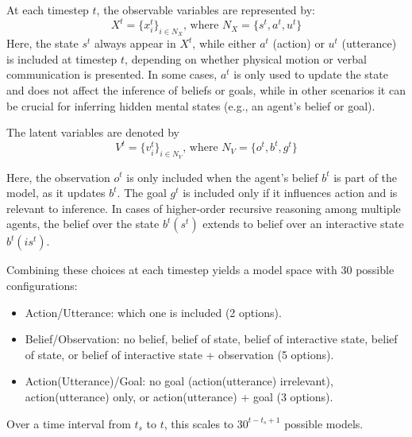 At each timestep $t$, the observable variables are represented by:
$$X^t = \{x_i^t\}_{i \in N_X} \text{, where } N_X = \{s^t, a^t, u^t\}$$
Here, the state $s^t$ always appear in $X^t$, while either $a^t$ (action) or $u^t$ (utterance) is included at timestep $t$, depending on whether physical motion or verbal communication is presented. In some cases, $a^t$ is only used to update the state and does not affect the inference of beliefs or goals, while in other scenarios it can be crucial for inferring hidden mental states (e.g., an agent’s belief or goal).

The latent variables are denoted by
$$V^t = \{v_i^t\}_{i \in N_V} \text{, where } N_V = \{o^t, b^t, g^t\}$$

Here, the observation $o^t$ is only included when the agent’s belief $b^t$ is part of the model, as it updates $b^t$. The goal $g^t$ is included only if it influences action and is relevant to inference. In cases of higher-order recursive reasoning among multiple agents, the belief over the state $b^t(s^t)$ extends to belief over an interactive state $b^t(is^t)$.

Combining these choices at each timestep yields a model space with 30 possible configurations:
\begin{itemize}
\setlength\itemsep{0pt}
    \item Action/Utterance: which one is included (2 options).
    \item Belief/Observation: no belief, belief of state, belief of interactive state, belief of state, or belief of interactive state + observation (5 options).
    \item Action(Utterance)/Goal: no goal (action(utterance) irrelevant), action(utterance) only, or action(utterance) + goal (3 options).
\end{itemize}
Over a time interval from $t_s$ to $t$, this scales to $30^{t-t_s+1}$ possible models.



